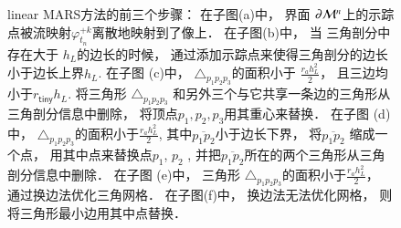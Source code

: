 \begin{figure}
	\hfill
	\caption[linear MARS方法的前三个步骤演示]{linear MARS方法的前三个步骤：
		在子图(a)中，
		界面 $\partial{\cal M}^n$上的示踪点被流映射$\varphi_{t_n}^{+k}$离散地映射到了像上．
		在子图(b)中，
		当 三角剖分中存在大于 $h_L$的边长的时候，
		通过添加示踪点来使得三角剖分的边长小于边长上界$h_L$.
		在子图 (c)中， 
		$\triangle_{p_1 p_2 p_3}$的面积小于  $\frac{r_ah_L^2}{2}$，
		且三边均小于$r_{\mathsf{tiny}}h_L.$ 
		将三角形 $\triangle_{p_1 p_2 p_3}$ 和另外三个与它共享一条边的三角形从三角剖分信息中删除，
		将顶点$p_1,p_2,p_3$用其重心来替换．
		在子图 (d)中，
		$\triangle_{p_1 p_2 p_3}$的面积小于$\frac{r_ah_L^2}{2}$, 
		其中$\overline{p_1 p_2}$小于边长下界，
		将$\overline{p_1 p_2}$ 缩成一个点，
		用其中点来替换点$p_1$, $p_2$ ,
		并把$\overline{p_1 p_2}$所在的两个三角形从三角剖分信息中删除．
		在子图 (e)中，
		三角形 $\triangle_{p_1 p_2 p_3}$的面积小于$\frac{r_ah_L^2}{2}$，
		通过换边法优化三角网格．
		在子图(f)中，
		换边法无法优化网格，
		则将三角形最小边用其中点替换．
	}
\end{figure}

